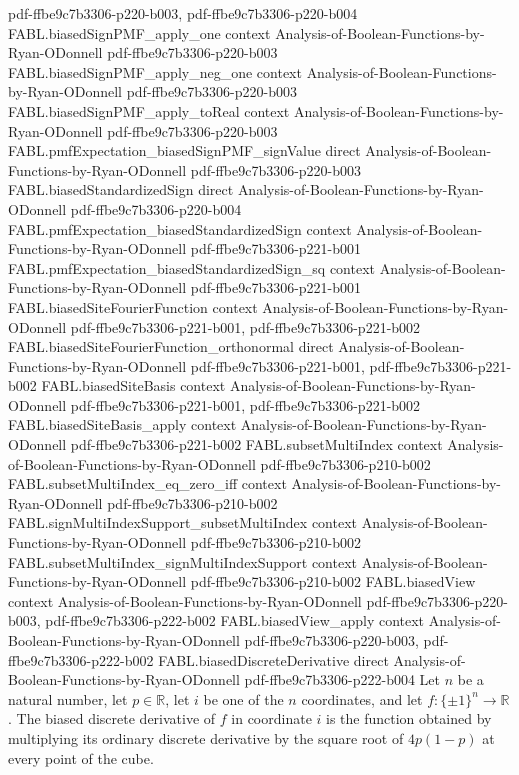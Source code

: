 \begin{theorem}
  {pdf-ffbe9c7b3306-p220-b003,
    pdf-ffbe9c7b3306-p220-b004}
\proofstep
  {FABL.biasedSignPMF_apply_one}
  {context}
  {Analysis-of-Boolean-Functions-by-Ryan-ODonnell}
  {pdf-ffbe9c7b3306-p220-b003}
\proofstep
  {FABL.biasedSignPMF_apply_neg_one}
  {context}
  {Analysis-of-Boolean-Functions-by-Ryan-ODonnell}
  {pdf-ffbe9c7b3306-p220-b003}
\proofstep
  {FABL.biasedSignPMF_apply_toReal}
  {context}
  {Analysis-of-Boolean-Functions-by-Ryan-ODonnell}
  {pdf-ffbe9c7b3306-p220-b003}
\proofstep
  {FABL.pmfExpectation_biasedSignPMF_signValue}
  {direct}
  {Analysis-of-Boolean-Functions-by-Ryan-ODonnell}
  {pdf-ffbe9c7b3306-p220-b003}
\proofstep
  {FABL.biasedStandardizedSign}
  {direct}
  {Analysis-of-Boolean-Functions-by-Ryan-ODonnell}
  {pdf-ffbe9c7b3306-p220-b004}
\proofstep
  {FABL.pmfExpectation_biasedStandardizedSign}
  {context}
  {Analysis-of-Boolean-Functions-by-Ryan-ODonnell}
  {pdf-ffbe9c7b3306-p221-b001}
\proofstep
  {FABL.pmfExpectation_biasedStandardizedSign_sq}
  {context}
  {Analysis-of-Boolean-Functions-by-Ryan-ODonnell}
  {pdf-ffbe9c7b3306-p221-b001}
\proofstep
  {FABL.biasedSiteFourierFunction}
  {context}
  {Analysis-of-Boolean-Functions-by-Ryan-ODonnell}
  {pdf-ffbe9c7b3306-p221-b001,
    pdf-ffbe9c7b3306-p221-b002}
\proofstep
  {FABL.biasedSiteFourierFunction_orthonormal}
  {direct}
  {Analysis-of-Boolean-Functions-by-Ryan-ODonnell}
  {pdf-ffbe9c7b3306-p221-b001,
    pdf-ffbe9c7b3306-p221-b002}
\proofstep
  {FABL.biasedSiteBasis}
  {context}
  {Analysis-of-Boolean-Functions-by-Ryan-ODonnell}
  {pdf-ffbe9c7b3306-p221-b001,
    pdf-ffbe9c7b3306-p221-b002}
\proofstep
  {FABL.biasedSiteBasis_apply}
  {context}
  {Analysis-of-Boolean-Functions-by-Ryan-ODonnell}
  {pdf-ffbe9c7b3306-p221-b002}
\proofstep
  {FABL.subsetMultiIndex}
  {context}
  {Analysis-of-Boolean-Functions-by-Ryan-ODonnell}
  {pdf-ffbe9c7b3306-p210-b002}
\proofstep
  {FABL.subsetMultiIndex_eq_zero_iff}
  {context}
  {Analysis-of-Boolean-Functions-by-Ryan-ODonnell}
  {pdf-ffbe9c7b3306-p210-b002}
\proofstep
  {FABL.signMultiIndexSupport_subsetMultiIndex}
  {context}
  {Analysis-of-Boolean-Functions-by-Ryan-ODonnell}
  {pdf-ffbe9c7b3306-p210-b002}
\proofstep
  {FABL.subsetMultiIndex_signMultiIndexSupport}
  {context}
  {Analysis-of-Boolean-Functions-by-Ryan-ODonnell}
  {pdf-ffbe9c7b3306-p210-b002}
\proofstep
  {FABL.biasedView}
  {context}
  {Analysis-of-Boolean-Functions-by-Ryan-ODonnell}
  {pdf-ffbe9c7b3306-p220-b003,
    pdf-ffbe9c7b3306-p222-b002}
\proofstep
  {FABL.biasedView_apply}
  {context}
  {Analysis-of-Boolean-Functions-by-Ryan-ODonnell}
  {pdf-ffbe9c7b3306-p220-b003,
    pdf-ffbe9c7b3306-p222-b002}
\proofstep
  {FABL.biasedDiscreteDerivative}
  {direct}
  {Analysis-of-Boolean-Functions-by-Ryan-ODonnell}
  {pdf-ffbe9c7b3306-p222-b004}
Let $n$ be a natural number, let $p\in\mathbb R$, let $i$ be one of the $n$ coordinates,
and let $f:\{\pm1\}^n\to\mathbb R$. The biased discrete derivative of $f$ in coordinate
$i$ is the function obtained by multiplying its ordinary discrete derivative by the
square root of $4p(1-p)$ at every point of the cube.
\end{theorem}


